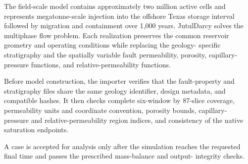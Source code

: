 
\label{sec:si-field-scale-reservoir-simulation}


The field-scale model contains approximately two million active cells and
represents megatonne-scale \coTwo{} injection into the offshore Texas storage
interval followed by migration and containment over 1,000 years. JutulDarcy
solves the multiphase flow problem. Each realization preserves the common
reservoir geometry and operating conditions while replacing the geology-
specific stratigraphy and the spatially variable fault permeability,
porosity, capillary-pressure functions, and relative-permeability functions.



Before model construction, the importer verifies that the fault-property and
stratigraphy files share the same geology identifier, design metadata, and
compatible hashes. It then checks complete six-window by 87-slice coverage,
permeability units and coordinate convention, porosity bounds, capillary-
pressure and relative-permeability region indices, and consistency of the
native saturation endpoints.


A case is accepted for analysis only after the simulation reaches the
requested final time and passes the prescribed mass-balance and output-
integrity checks.

